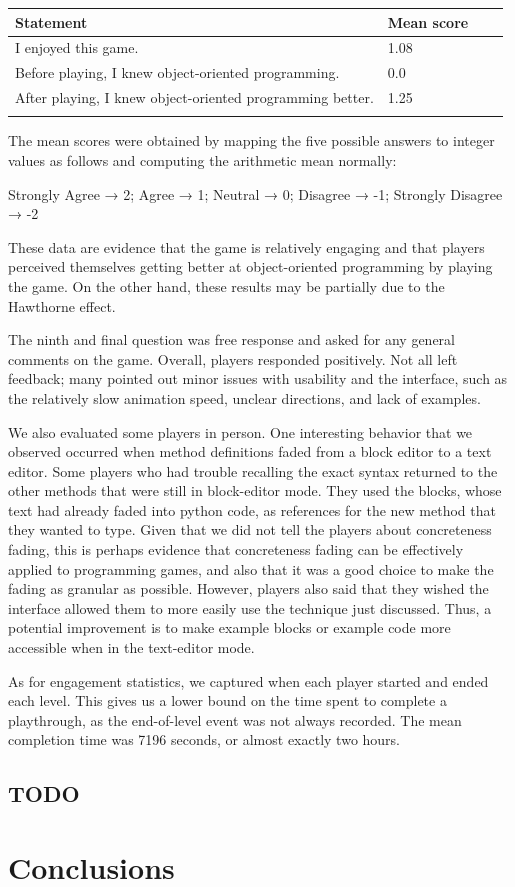 \documentclass[12pt,notitlepage]{article}
\begin{document}
\begin{tabu}{Xlll}
\toprule
Statement & Mean score \\
\midrule
I enjoyed this game. & 1.08 \\
Before playing, I knew object-oriented programming. & 0.0 \\
After playing, I knew object-oriented programming better. & 1.25\\
\bottomrule
\\
\end{tabu}

The mean scores were obtained by mapping the five possible answers to integer
values as follows and computing the arithmetic mean normally:\\
\centerline{Strongly Agree → 2; Agree → 1; Neutral → 0; Disagree → -1; Strongly Disagree → -2}

These data are evidence that the game is relatively engaging and that players
perceived themselves getting better at object-oriented programming by playing
the game. On the other hand, these results may be partially due to the
Hawthorne effect.

The ninth and final question was free response and asked for any general
comments on the game. Overall, players responded positively. Not all left
feedback; many pointed out minor issues with usability and the interface,
such as the relatively slow animation speed, unclear directions, and lack
of examples.

We also evaluated some players in person.
One interesting behavior that we observed occurred when method definitions
faded from a block editor to a text editor. Some players who had trouble
recalling the exact syntax returned to the other methods that were still in
block-editor mode. They used the blocks, whose text had already faded into
python code, as references for the new method that they wanted to type. Given
that we did not tell the players about concreteness fading, this is perhaps
evidence that concreteness fading can be effectively applied to programming
games, and also that it was a good choice to make the fading as granular as
possible. However, players also said that they wished the interface allowed
them to more easily use the technique just discussed. Thus, a potential
improvement is to make example blocks or example code more accessible when
in the text-editor mode.

As for engagement statistics, we captured when each player started and
ended each level. This gives us a lower bound on the time spent to
complete a playthrough, as the end-of-level event was not always
recorded. The mean completion time was 7196 seconds, or almost exactly
two hours.

\subsection{TODO}

\section{Conclusions}
\end{document}
